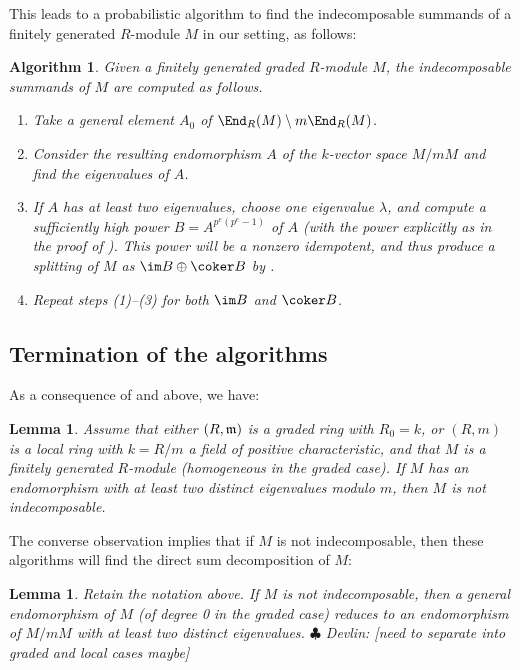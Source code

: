 \documentclass[12pt]{article}
\let\l\lambda
\theoremstyle{theorem}
\numberwithin{thm}{section}
\newtheorem{algm}[thm]{Algorithm}
\newtheorem{lem}[thm]{Lemma}
\theoremstyle{definition}
\newcommand{\devlin}[1]{{\color{red} \sf $\clubsuit$ Devlin: [#1]}}
\begin{document}
This leads to a probabilistic algorithm to find the indecomposable summands of a finitely generated $R$-module $M$ in our setting, as follows:

\begin{algm}\label{local_algorithm}
Given a finitely generated graded $R$-module $M$, the indecomposable summands of $M$ are computed as follows.
  \begin{enumerate}
\item Take a general element $A_0$ of $\End_R(M) \setminus m \End_R(M)$.
  \item Consider the resulting endomorphism $A$ of the $k$-vector space $M/mM$ and find the eigenvalues of $A$.
  \item If $A$ has at least two eigenvalues, choose one eigenvalue $\l$, and compute a sufficiently high power $B=A^{p^e(p^{e}-1)}$ of $A$ (with the power explicitly as in the proof of ). This power will be a nonzero idempotent, and thus produce a splitting of $M$ as $\im B \oplus \coker B$ by .
  \item Repeat steps (1)--(3) for both $\im B$ and $\coker B$.
  \end{enumerate}
\end{algm}

\subsection{Termination of the algorithms}

As a consequence of  and  above, we have:

\begin{lem}
Assume that either $(R,\mathfrak m)$ is a graded ring with $R_0=k$, or $(R,m)$ is a local ring with $k=R/m$ a field of positive characteristic, and that $M$ is a finitely generated $R$-module (homogeneous in the graded case).
If $M$ has an endomorphism with at least two distinct eigenvalues modulo $m$, then $M$ is not indecomposable.
\end{lem}

The converse observation implies that if $M$ is not indecomposable, then these algorithms will find the direct sum decomposition of $M$:

\begin{lem}
\label{lemma_term}
Retain the notation above.
  If $M$ is not indecomposable, then a general endomorphism of $M$ (of degree 0 in the graded case) reduces to an endomorphism of $M/mM$ with at least two distinct eigenvalues.
\devlin{need to separate into graded and local cases maybe}
\end{lem}
\end{document}
